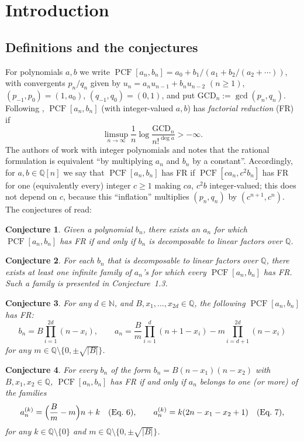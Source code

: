 \documentclass[11pt]{amsart}
\newtheorem{conjecture}{Conjecture}
\theoremstyle{definition}
\theoremstyle{remark}
\numberwithin{equation}{section}
\newcommand{\PCF}{\operatorname{PCF}}
\newcommand{\Q}{\mathbb{Q}}
\newcommand{\GCD}{\mathrm{GCD}}
\begin{document}
\section{Introduction}

\subsection{Definitions and the conjectures}
For polynomials $a,b$ we write $\PCF[a_n,b_n]=a_0+b_1/(a_1+b_2/(a_2+\cdots))$, with convergents $p_n/q_n$ given by $u_n=a_nu_{n-1}+b_nu_{n-2}$ $(n\ge1)$, $(p_{-1},p_0)=(1,a_0)$, $(q_{-1},q_0)=(0,1)$, and put $\GCD_n:=\gcd(p_n,q_n)$. Following \cite[\S2.1]{BDNM}, $\PCF[a_n,b_n]$ (with integer-valued $a,b$) has \emph{factorial reduction} (FR) if
\[
\limsup_{n\to\infty}\frac1n\log\frac{\GCD_n}{n!^{\deg a}}>-\infty .
\]
The authors of \cite{BDNM} work with integer polynomials and notes that the rational formulation is equivalent ``by multiplying $a_n$ and $b_n$ by a constant''. Accordingly, for $a,b\in\Q[n]$ we say that $\PCF[a_n,b_n]$ has FR if $\PCF[ca_n,c^2b_n]$ has FR for one (equivalently every) integer $c\ge1$ making $ca$, $c^2b$ integer-valued; this does not depend on $c$, because this ``inflation'' multiplies $(p_n,q_n)$ by $(c^{n+1},c^n)$. The conjectures of \cite[\S2.3]{BDNM} read:

\begin{conjecture}
Given a polynomial $b_n$, there exists an $a_n$ for which $\PCF[a_n,b_n]$ has FR if and only if $b_n$ is decomposable to linear factors over $\Q$.
\end{conjecture}
\begin{conjecture}
For each $b_n$ that is decomposable to linear factors over $\Q$, there exists at least one infinite family of $a_n$'s for which every $\PCF[a_n,b_n]$ has FR. Such a family is presented in Conjecture~1.3.
\end{conjecture}
\begin{conjecture}
For any $d\in\mathbb N$, and $B,x_1,\dots,x_{2d}\in\Q$, the following $\PCF[a_n,b_n]$ has FR:
\[
b_n=B\prod_{i=1}^{2d}(n-x_i),\qquad a_n=\frac Bm\prod_{i=1}^d(n+1-x_i)-m\prod_{i=d+1}^{2d}(n-x_i)
\]
for any $m\in\Q\setminus\{0,\pm\sqrt{|B|}\}$.
\end{conjecture}
\begin{conjecture}
For every $b_n$ of the form $b_n=B(n-x_1)(n-x_2)$ with $B,x_1,x_2\in\Q$, $\PCF[a_n,b_n]$ has FR if and only if $a_n$ belongs to one (or more) of the families
\begin{equation}\label{eq:fam}
a_n^{(k)}=\Bigl(\frac Bm-m\Bigr)n+k\quad\text{(Eq.~6)},\qquad a_n^{(k)}=k(2n-x_1-x_2+1)\quad\text{(Eq.~7)},
\end{equation}
for any $k\in\Q\setminus\{0\}$ and $m\in\Q\setminus\{0,\pm\sqrt{|B|}\}$.
\end{conjecture}
\end{document}
